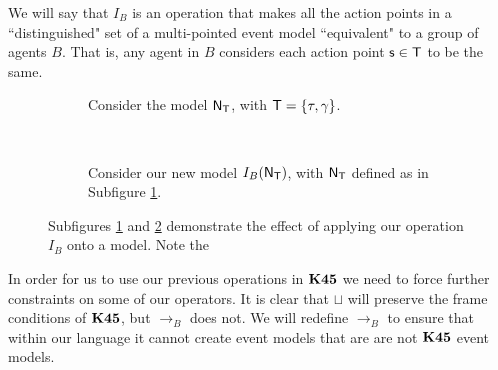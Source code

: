 We will say that $I_B$ is an operation that makes all the action
points in a ``distinguished" set of a multi-pointed event model ``equivalent" to a
group of agents $B$.
That is, any agent in $B$ considers each action point $\mathrm{\mathsf{s}} \in \mathrm{\mathsf{T}}$ to be the
same.

\begin{figure}[ht!]
\centering
\begin{subfigure}[b]{.45\textwidth}
\centering
{}
\caption{Consider the model $\mathrm{\mathsf{N}}_\mathrm{\mathsf{T}}$, with $\mathrm{\mathsf{T}} = \{\tau, \gamma\}$.}
\label{beforeOperation}
\end{subfigure}
~
\begin{subfigure}[b]{.45\textwidth}
\centering
{}
\caption{Consider our new model $I_B(\mathrm{\mathsf{N}}_\mathrm{\mathsf{T}})$, with $\mathrm{\mathsf{N}}_\mathrm{\mathsf{T}}$ defined as in Subfigure
\ref{beforeOperation}.}
\label{afterOperation}
\end{subfigure}
\caption{Subfigures \ref{beforeOperation} and \ref{afterOperation} demonstrate the effect of
applying our operation $I_B$ onto a model.
Note the }
\label{k45VsKModels}
\end{figure}

In order for us to use our previous operations in $\bf K45$ we need to force further constraints on
some of our operators.
It is clear that $\sqcup$ will preserve the frame conditions of $\bf K45$, but $\to_B$ does not.
We will redefine $\to_B$ to ensure that within our language it cannot create event models that are
are not $\bf K45$ event models.

